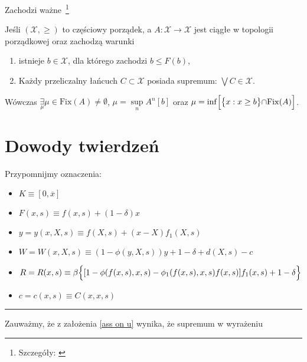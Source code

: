 Zachodzi ważne~\footnote{Szczegóły: \citet[][str. 26-27]{Granas_FPT}}

\begin{tw}\label{Tarski}
	Jeśli $ (\mathcal{X}, \geq) $ to częściowy porządek, a $ A: \mathcal{X}\rightarrow \mathcal{X} $ jest ciągłe w topologii porządkowej oraz zachodzą warunki 
	\begin{enumerate}
		\item{istnieje $ b \in \mathcal{X} $, dla którego zachodzi $ b \leq F(b) $,}
		\item{Każdy przeliczalny łańcuch $ C \subset \mathcal{X} $  posiada supremum: $ \bigvee C \in \mathcal{X} $.}
	\end{enumerate}
Wówczas $ \underset{\mu}{\exists} \mu \in \mathrm{Fix}(A) \not= \emptyset $, $ \mu = \underset{n}{\sup} A^{n}[b]$ oraz $\mu = \inf \Bigl[ \bigl\{ x : x \geq b \bigl\} \cap \mathrm{Fix}(A)\Bigl]$.
\end{tw}

\newpage


\section{Dowody twierdzeń}

Przypomnijmy oznaczenia:

\begin{itemize}
	\item{$ K \equiv [0, \overline{x}]$}
	\item{$ F(x, s) \equiv f(x,s) + (1 - \delta)x $}
	\item{$y = y(x,X,s) \equiv f(X, s) + (x - X)f_1 (X,s)$} 
	\item{$W = W(x,X,s) \equiv (1- \phi(y,X,s))y + 1 - \delta + d(X,s) - c $}	
	\item{$R = R(x,s) \equiv \beta \Bigl \{[1 - \phi(f(x,s),x,s) - \phi_1 (f(x,s),x,s)f(x,s)]f_1 (x,s) + 1 - \delta \Bigl \} $}
	\item{$c = c(x,s) \equiv C(x,x,s)$}

\end{itemize}

\hrule

\begin{dowod}\label{proof_Euler}
\end{dowod}

Zauważmy, że z założenia \ref{ass on u} wynika, że supremum w wyrażeniu 

